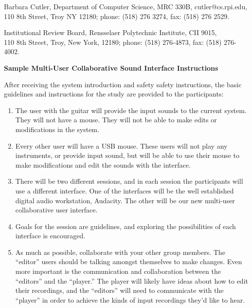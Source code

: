 \documentclass[10pt]{article}
\begin{document}
\noindent
Barbara Cutler, Department of Computer Science, MRC 330B, cutler@cs.rpi.edu,\\
110 8th Street, Troy NY 12180; phone: (518) 276 3274, fax: (518) 276 2529.

\noindent
Institutional Review Board, Rensselaer Polytechnic Institute, CII 9015, \\
110 8th Street, Troy, New York, 12180; phone: (518) 276-4873, fax: (518) 276-4002.
\vspace{-0.8in}

\newpage

\noindent
{\bf {\Large Sample Multi-User Collaborative Sound Interface Instructions}}

\vspace{0.2in}
\noindent
After receiving the system introduction and safety safety
instructions, the basic guidelines and instructions for the study 
are provided to the participants:

\begin{enumerate}

\item The user with the guitar will provide the input sounds to the 
  current system. They will not have a mouse. They will not be able to 
  make edits or modifications in the system.

\item Every other user will have a USB mouse. These users will not play any 
  instruments, or provide input sound, but will be able to use their mouse
  to make modifications and edit the sounds with the interface.
  
\item There will be two different sessions, and in each session the participants
  will use a different interface. One of the interfaces will be the well established
  digital audio workstation, Audacity. The other will be our new multi-user collaborative
  user interface. 
  
\item Goals for the session are guidelines, and exploring the possibilities of each
  interface is encouraged.
  
\item As much as possible, collaborate with your other group members. The ``editor'' users
  should be talking amongst themselves to make changes. Even more important is the communication
  and collaboration between the ``editors'' and the ``player.'' The player will likely have
  ideas about how to edit their recordings, and the ``editors'' will need to communicate with
  the ``player'' in order to achieve the kinds of input recordings they'd like to hear.
  
\end{enumerate}
\end{document}
